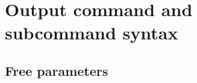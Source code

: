 \section{Output command and subcommand syntax\label{sec:output-syntax}}

\subsection{Free parameters\label{sec:InputFileFormat}}

